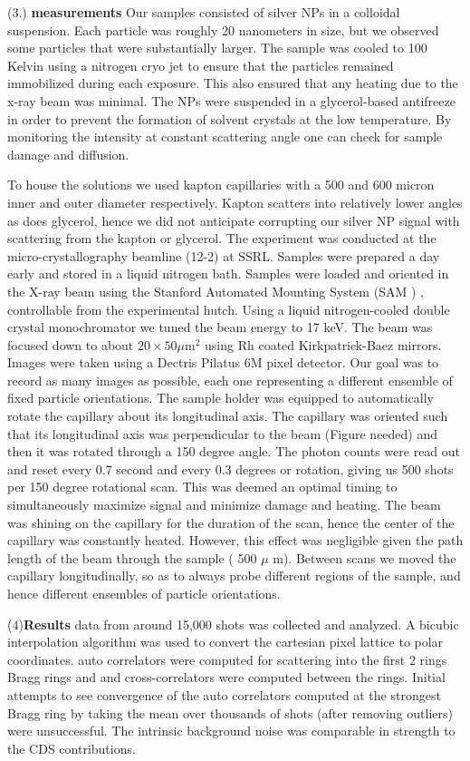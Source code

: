 \documentclass [11pt,fleqn]{article}
\def \hfb {\hfill\break}
\begin{document}
(3.) {\bf measurements}\hfb
Our samples consisted of silver NPs in a colloidal suspension. Each particle was roughly 20
nanometers in size, but we observed some particles that were substantially larger.
The sample was cooled to 100 Kelvin using a nitrogen cryo jet to ensure that the particles remained immobilized during each exposure. This also ensured that  any heating due to the x-ray beam was minimal. The NPs were suspended in a glycerol-based antifreeze
in order to prevent the formation of solvent crystals at the low temperature. By
monitoring the intensity at constant scattering angle one can check for sample
damage and diffusion.

To house the solutions we used kapton capillaries with a 500 and 600 micron inner
and outer diameter respectively. Kapton scatters into relatively lower angles as
does glycerol, hence we did not anticipate corrupting our silver NP signal with scattering from the kapton or glycerol.  The experiment was conducted at the micro-crystallography beamline (12-2) at
SSRL. Samples were prepared a day early and stored in a liquid nitrogen bath.
Samples were loaded and oriented in the X-ray beam using the Stanford Automated Mounting System (SAM ) , controllable from the experimental hutch.
Using a liquid nitrogen-cooled double crystal monochromator we tuned the beam
energy to 17 keV. The beam was focused down to about $20 \times 50 \mu$m$^2$ using Rh
coated Kirkpatrick-Baez mirrors.
Images were taken using a Dectris Pilatus 6M pixel detector. Our goal was to record as many images as possible, each one representing a different ensemble of
fixed particle orientations. The sample holder was equipped to automatically 
rotate the capillary about its longitudinal axis. The capillary was oriented such that
its longitudinal axis was perpendicular to the beam (Figure needed) and then it
was rotated through a 150 degree angle. The photon counts were read out and
reset every 0.7 second and every 0.3 degrees or rotation, giving us 500 shots per
150 degree rotational scan. This was deemed an optimal timing to simultaneously
maximize signal and minimize damage and heating. The beam was shining on
the capillary for the duration of the scan, hence the center of the capillary was
constantly heated. However, this effect was negligible given the path length of
the beam through the sample ( 500 $\mu$ m). Between scans we moved the capillary
longitudinally, so as to always probe different regions of the sample, and hence
different ensembles of particle orientations.

(4){\bf Results}\hfb
data from around 15,000 shots was collected and analyzed. A bicubic interpolation algorithm was used to convert the cartesian pixel lattice to polar coordinates. auto correlators were computed for scattering into the first 2 rings Bragg rings and and cross-correlators were computed between the rings.  
Initial attempts to see convergence of the auto correlators computed at the strongest  Bragg ring by taking the mean over thousands of shots (after removing outliers)  were unsuccessful. The intrinsic background noise was comparable in strength to the CDS contributions. 
\end{document}
